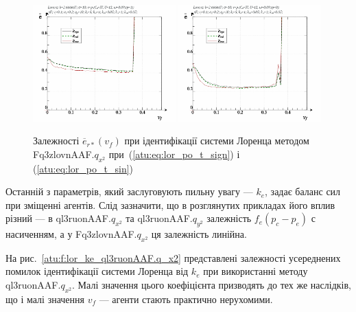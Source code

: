 \begin{figure}[ht!]
  \centerline{
    \includegraphics[width=0.49\textwidth]{p/cha/lor/Fq3zlovnAAF/lor_Fq3zlovnAAF_qx2-p_v_f_e_sign.png}
    \hfill
    \includegraphics[width=0.49\textwidth]{p/cha/lor/Fq3zlovnAAF/lor_Fq3zlovnAAF_qx2-p_v_f_e_sin.png}
  }
\caption{Залежності $ \overline{e}_{r *} (v_f) $ при ідентифікації системи Лоренца методом Fq3zlovnAAF.$q_{x^2} $ при~(\ref{atu:eq:lor_po_t_sign}) і (\ref{atu:eq:lor_po_t_sin})}
\label{atu:f:lor_vf_Fq3zlovnAAF.q_x2}
\end{figure}

Останній з параметрів, який заслуговують пильну увагу ---
$ k_e $, задає баланс сил при зміщенні агентів. Слід
зазначити, що в розглянутих прикладах його вплив різний ---
в ql3ruonAAF.$q_{x^2}$ та ql3ruonAAF.$q_{y^2}$
залежність $f_e(p_c-p_e)$ с насиченням,
а у Fq3zlovnAAF.$q_{x^2}$ ця залежність линійна.

На рис.~\ref{atu:f:lor_ke_ql3ruonAAF.q_x2} представлені залежності усереднених
помилок ідентифікації системи Лоренца від
$k_e$ при використанні методу ql3ruonAAF.$q_{x^2} $. Малі значення цього коефіцієнта призводять до тех же
наслідків, що і малі значення $ v_f $ --- агенти стають практично нерухомими.

